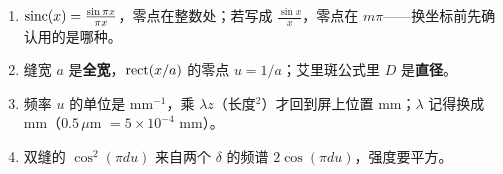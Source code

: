 \begin{warn}[远场图样易错]
\begin{enumerate}
\item $\operatorname{sinc}(x)=\frac{\sin\pi x}{\pi x}$，零点在整数处；若写成 $\frac{\sin x}{x}$，零点在 $m\pi$——换坐标前先确认用的是哪种。
\item 缝宽 $a$ 是\textbf{全宽}，$\operatorname{rect}(x/a)$ 的零点 $u=1/a$；艾里斑公式里 $D$ 是\textbf{直径}。
\item 频率 $u$ 的单位是 mm$^{-1}$，乘 $\lambda z$（长度$^2$）才回到屏上位置 mm；$\lambda$ 记得换成 mm（$0.5\,\mu$m $=5\times10^{-4}$ mm）。
\item 双缝的 $\cos^2(\pi du)$ 来自两个 $\delta$ 的频谱 $2\cos(\pi du)$，强度要平方。
\end{enumerate}
\end{warn}
